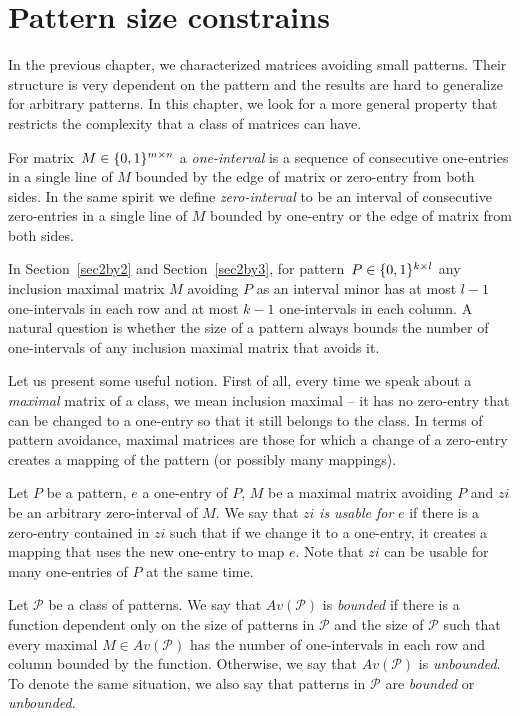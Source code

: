 \chapter{Pattern size constrains}
In the previous chapter, we characterized matrices avoiding small patterns. Their structure is very dependent on the pattern and the results are hard to generalize for arbitrary patterns. In this chapter, we look for a more general property that restricts the complexity that a class of matrices can have.

\begin{defn}
For matrix~$M\in\{0,1\}^{m\times n}$ a \emph{one-interval} is a sequence of consecutive one-entries in a single line of $M$ bounded by the edge of matrix or zero-entry from both sides. In the same spirit we define \emph{zero-interval} to be an interval of consecutive zero-entries in a single line of $M$ bounded by one-entry or the edge of matrix from both sides.
\end{defn}

In Section~\ref{sec2by2} and Section~\ref{sec2by3}, for pattern~$P\in\{0,1\}^{k\times l}$ any inclusion maximal matrix $M$ avoiding $P$ as an interval minor has at most $l-1$ one-intervals in each row and at most $k-1$ one-intervals in each column. A natural question is whether the size of a pattern always bounds the number of one-intervals of any inclusion maximal matrix that avoids it.

Let us present some useful notion. First of all, every time we speak about a \emph{maximal} matrix of a class, we mean inclusion maximal -- it has no zero-entry that can be changed to a one-entry so that it still belongs to the class. In terms of pattern avoidance, maximal matrices are those for which a change of a zero-entry creates a mapping of the pattern (or possibly many mappings).

\begin{defn}
Let $P$ be a pattern, $e$ a one-entry of $P$, $M$ be a maximal matrix avoiding $P$ and $zi$ be an arbitrary zero-interval of $M$. We say that $zi$ \emph{is usable for} $e$ if there is a zero-entry contained in $zi$ such that if we change it to a one-entry, it creates a mapping that uses the new one-entry to map $e$. Note that $zi$ can be usable for many one-entries of $P$ at the same time. 
\end{defn}

\begin{defn}
Let $\mathcal{P}$ be a class of patterns. We say that $Av(\mathcal{P})$ is \emph{bounded} if there is a function dependent only on the size of patterns in $\mathcal{P}$ and the size of $\mathcal{P}$ such that every maximal $M\in Av(\mathcal{P})$ has the number of one-intervals in each row and column bounded by the function. Otherwise, we say that $Av(\mathcal{P})$ is \emph{unbounded}. To denote the same situation, we also say that patterns in $\mathcal{P}$ are \emph{bounded} or \emph{unbounded}.
\end{defn}


